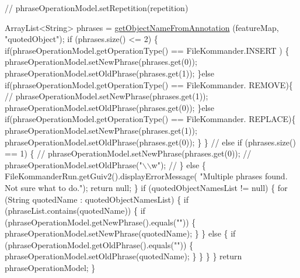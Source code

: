\begin{DoxyCode}
        \textcolor{comment}{// phraseOperationModel.setRepetition(repetition)}

        ArrayList<String> phrases = \hyperlink{classcom_1_1poly_1_1nlp_1_1filekommander_1_1file_1_1actions_1_1_analyse_action_a8652e1bba48585a8c416e6e212fe4766}{getObjectNameFromAnnotation}
      (featureMap,
                \textcolor{stringliteral}{"quotedObject"});
        \textcolor{keywordflow}{if} (phrases.size() <= 2) \{
            \textcolor{keywordflow}{if}(phraseOperationModel.getOperationType() == FileKommander.INSERT 
      ) \{
            phraseOperationModel.setNewPhrase(phrases.get(0));
            phraseOperationModel.setOldPhrase(phrases.get(1));
            \}\textcolor{keywordflow}{else} \textcolor{keywordflow}{if}(phraseOperationModel.getOperationType() == FileKommander.
      REMOVE)\{
            \textcolor{comment}{//  phraseOperationModel.setNewPhrase(phrases.get(1));}
                phraseOperationModel.setOldPhrase(phrases.get(0));
            \}\textcolor{keywordflow}{else} \textcolor{keywordflow}{if}(phraseOperationModel.getOperationType() == FileKommander.
      REPLACE)\{
                phraseOperationModel.setNewPhrase(phrases.get(1));
                phraseOperationModel.setOldPhrase(phrases.get(0));
            \}
        \} 
\textcolor{comment}{//      else if (phrases.size() == 1) \{}
\textcolor{comment}{//          phraseOperationModel.setNewPhrase(phrases.get(0));}
\textcolor{comment}{//          phraseOperationModel.setOldPhrase("\(\backslash\)\(\backslash\)w");}
\textcolor{comment}{//      \}}
        \textcolor{keywordflow}{else} \{
            FileKommanderRun.getGuiv2().displayErrorMessage(
                    \textcolor{stringliteral}{"Multiple phrases found. Not sure what to do."});
            \textcolor{keywordflow}{return} null;
        \}
        \textcolor{keywordflow}{if} (quotedObjectNamesList != null) \{
            \textcolor{keywordflow}{for} (String quotedName : quotedObjectNamesList) \{
                \textcolor{keywordflow}{if} (phraseList.contains(quotedName)) \{
                    \textcolor{keywordflow}{if} (phraseOperationModel.getNewPhrase().equals(\textcolor{stringliteral}{""})) \{
                        phraseOperationModel.setNewPhrase(quotedName);
                    \}
                \} \textcolor{keywordflow}{else} \{
                    \textcolor{keywordflow}{if} (phraseOperationModel.getOldPhrase().equals(\textcolor{stringliteral}{""})) \{
                        phraseOperationModel.setOldPhrase(quotedName);
                    \}
                \}
            \}
        \}
        \textcolor{keywordflow}{return} phraseOperationModel;
    \}
\end{DoxyCode}
